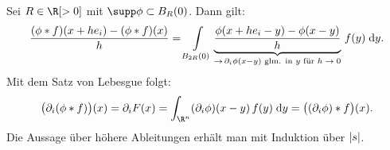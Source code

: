 \begin{proofsketch}
    Sei $R\in\R[>0]$ mit $\supp\phi \subset B_R(0)$. Dann gilt:
    \[ \frac{(\phi\ast f)(x+he_i)-(\phi\ast f)(x)}{h}
        = \int\limits_{B_{2R}(0)} 
        \underbrace{\frac{\phi(x+he_i-y)-\phi(x-y)}{h}}_{
            \to \, \partial_i\phi(x-y) \text{ glm. in $y$ für $h\to0$}
        }\, f(y)
        \;\mathrm{d} y
    . \]
    Mit dem Satz von Lebesgue folgt:
    \[ \bigl(\partial_i(\phi\ast f)\bigr)(x)
        = \partial_i F(x) = \int_{\R^n} (\partial_i \phi)(x-y) \, f(y) \dif{y}
        = \bigl( (\partial_i\phi)\ast f \bigr)(x)
    . \]
    Die Aussage über höhere Ableitungen erhält man mit Induktion über $\lvert s\rvert$.
    \\
\end{proofsketch}
